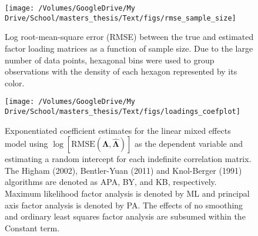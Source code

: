 \documentclass[
  english,
  man]{apa6}
\begin{document}
\begin{figure}

{\centering \texttt{[image: /Volumes/GoogleDrive/My Drive/School/masters\_thesis/Text/figs/rmse\_sample\_size]} 

}

\caption{Log root-mean-square error (RMSE) between the true and estimated factor loading matrices as a function of sample size. Due to the large number of data points, hexagonal bins were used to group observations with the density of each hexagon represented by its color.}\label{fig:RMSE-sample-size}
\end{figure}

\begin{figure}

{\centering \texttt{[image: /Volumes/GoogleDrive/My Drive/School/masters\_thesis/Text/figs/loadings\_coefplot]} 

}

\caption{Exponentiated coefficient estimates for the linear mixed effects model using $\log[\textrm{RMSE}(\mathbf{\Lambda}, \hat{\mathbf{\Lambda}})]$ as the dependent variable and estimating a random intercept for each indefinite correlation matrix. The Higham (2002), Bentler-Yuan (2011) and Knol-Berger (1991) algorithms are denoted as APA, BY, and KB, respectively. Maximum likelihood factor analysis is denoted by ML and principal axis factor analysis is denoted by PA. The effects of no smoothing and ordinary least squares factor analysis are subsumed within the Constant term.}\label{fig:coefplot-loading-recovery}
\end{figure}
\end{document}
